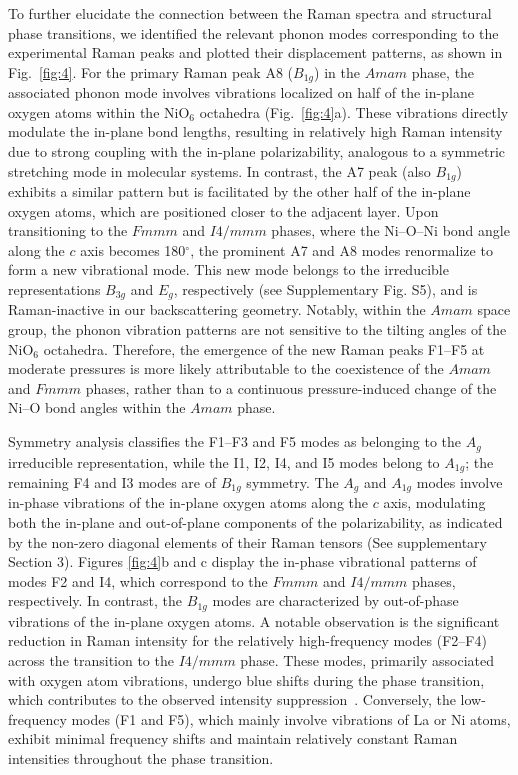 \documentclass[prx,aps,twocolumn,preprintnumbers,amsmath,amssymb,superscriptaddress,showpacs]{revtex4-2}
\begin{document}
To further elucidate the connection between the Raman spectra and structural phase transitions, we identified the relevant phonon modes corresponding to the experimental Raman peaks and plotted their displacement patterns, as shown in Fig.~\ref{fig:4}. For the primary Raman peak A8 ($B_{1g}$) in the $Amam$ phase, the associated phonon mode involves vibrations localized on half of the in-plane oxygen atoms within the NiO$_6$ octahedra (Fig.~\ref{fig:4}a). These vibrations directly modulate the in-plane bond lengths, resulting in relatively high Raman intensity due to strong coupling with the in-plane polarizability, analogous to a symmetric stretching mode in molecular systems. In contrast, the A7 peak (also $B_{1g}$) exhibits a similar pattern but is facilitated by the other half of the in-plane oxygen atoms, which are positioned closer to the adjacent layer. Upon transitioning to the $Fmmm$ and $I4/mmm$ phases, where the Ni--O--Ni bond angle along the $c$ axis becomes 180$^\circ$, the prominent A7 and A8 modes renormalize to form a new vibrational mode. This new mode belongs to the irreducible representations $B_{3g}$ and $E_g$, respectively (see Supplementary Fig. S5), and is Raman-inactive in our backscattering geometry. Notably, within the $Amam$ space group, the phonon vibration patterns are not sensitive to the tilting angles of the NiO$_6$ octahedra. Therefore, the emergence of the new Raman peaks F1--F5 at moderate pressures is more likely attributable to the coexistence of the $Amam$ and $Fmmm$ phases, rather than to a continuous pressure-induced change of the Ni--O bond angles within the $Amam$ phase.


Symmetry analysis classifies the F1--F3 and F5 modes as belonging to the $A_{g}$ irreducible representation, while the I1, I2, I4, and I5 modes belong to $A_{1g}$; the remaining F4 and I3 modes are of $B_{1g}$ symmetry. The $A_{g}$ and $A_{1g}$ modes involve in-phase vibrations of the in-plane oxygen atoms along the $c$ axis, modulating both the in-plane and out-of-plane components of the polarizability, as indicated by the non-zero diagonal elements of their Raman tensors (See supplementary Section 3). Figures \ref{fig:4}b and c display the in-phase vibrational patterns of modes F2 and I4, which correspond to the $Fmmm$ and $I4/mmm$ phases, respectively. In contrast, the $B_{1g}$ modes are characterized by out-of-phase vibrations of the in-plane oxygen atoms. A notable observation is the significant reduction in Raman intensity for the relatively high-frequency modes (F2--F4) across the transition to the $I4/mmm$ phase. These modes, primarily associated with oxygen atom vibrations, undergo blue shifts during the phase transition, which contributes to the observed intensity suppression~\cite{HOLZER1969}. Conversely, the low-frequency modes (F1 and F5), which mainly involve vibrations of La or Ni atoms, exhibit minimal frequency shifts and maintain relatively constant Raman intensities throughout the phase transition.
\end{document}
